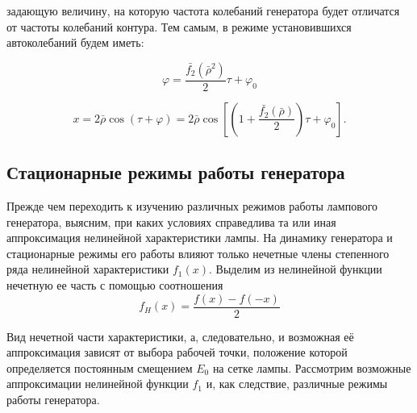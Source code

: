 задающую величину, на которую частота колебаний генератора будет отличатся от частоты колебаний контура. Тем самым, в режиме установившихся автоколебаний будем иметь:

\begin{equation}
\label{eq:14}
\varphi=\frac{\bar{f_2}(\bar{\rho}^2)}{2}\tau+\varphi_0
\end{equation}

\begin{equation}
\label{eq:15}
x=2\bar{\rho}\cos(\tau+\varphi)=2\bar{\rho}\cos[(1+\frac{\bar{f_2}(\bar{\rho})}{2})\tau+\varphi_0].
\end{equation}

\subsection{Стационарные режимы работы генератора}

Прежде чем переходить к изучению различных режимов работы лампового генератора, выясним, при каких условиях справедлива та или иная аппроксимация нелинейной характеристики лампы. На динамику генератора и стационарные режимы его работы влияют только нечетные члены степенного ряда нелинейной характеристики $f_{1}(x)$. Выделим из нелинейной функции нечетную ее часть с помощью соотношения
\begin{equation}
\label{eq:16}
f_H(x)=\frac{f(x)-f(-x)}{2}
\end{equation}

Вид нечетной части характеристики, а, следовательно, и возможная её аппроксимация зависят от выбора рабочей точки, положение которой определяется постоянным смещением $E_{0}$ на сетке лампы. Рассмотрим возможные аппроксимации нелинейной функции $f_{1}$ и, как следствие, различные режимы работы генератора.

